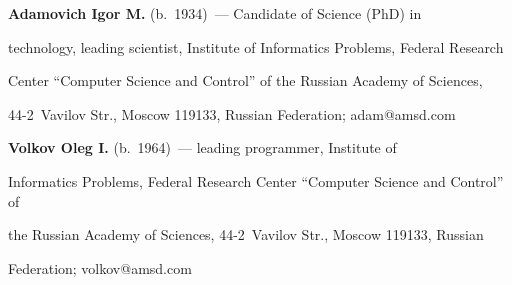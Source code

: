   


  \Contr


  


  \noindent


  \textbf{Adamovich Igor M.} (b.\ 1934)~--- Candidate of Science (PhD) in 


technology, leading scientist, Institute of Informatics Problems, Federal Research 


Center ``Computer Science and Control'' of the Russian Academy of Sciences,  


44-2~Vavilov Str., Moscow 119133, Russian Federation; \mbox{adam@amsd.com}


  


  \vspace*{3pt}


  


  \noindent


  \textbf{Volkov Oleg I.} (b.\ 1964)~--- leading programmer, Institute of 


Informatics Problems, Federal Research Center ``Computer Science and Control'' of 


the Russian Academy of Sciences, 44-2~Vavilov Str., Moscow 119133, Russian 


Federation; \mbox{volkov@amsd.com}


  


  


\label{end\stat}





\renewcommand{\bibname}{\protect\rm Литература} 


  


